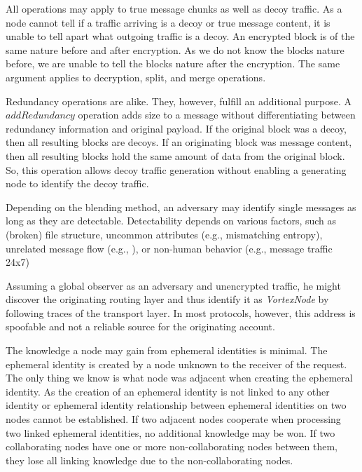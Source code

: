 \documentclass[acmsmall, screen]{acmart}
\begin{document}
All operations may apply to true message chunks as well as decoy traffic. As a node cannot tell if a traffic arriving is a decoy or true message content, it is unable to tell apart what outgoing traffic is a decoy. An encrypted block is of the same nature before and after encryption. As we do not know the blocks nature before, we are unable to tell the blocks nature after the encryption. The same argument applies to decryption, split, and merge operations. 

Redundancy operations are alike. They, however, fulfill an additional purpose. A $addRedundancy$ operation adds size to a message without differentiating between redundancy information and original payload. If the original block was a decoy, then all resulting blocks are decoys. If an originating block was message content, then all resulting blocks hold the same amount of data from the original block. So, this operation allows decoy traffic generation without enabling a generating node to identify the decoy traffic.

Depending on the blending method, an adversary may identify single messages as long as they are detectable. Detectability depends on various factors, such as (broken) file structure, uncommon attributes (e.g., mismatching entropy), unrelated message flow (e.g., \cite{oakland2013-parrot}), or non-human behavior (e.g., message traffic 24x7)

Assuming a global observer as an adversary and unencrypted traffic, he might discover the originating routing layer and thus identify it as \emph{VortexNode} by following traces of the transport layer. In most protocols, however, this address is spoofable and not a reliable source for the originating account.

The knowledge a node may gain from ephemeral identities is minimal. The ephemeral identity is created by a node unknown to the receiver of the request. The only thing we know is what node was adjacent when creating the ephemeral identity. As the creation of an ephemeral identity is not linked to any other identity or ephemeral identity relationship between ephemeral identities on two nodes cannot be established. If two adjacent nodes cooperate when processing two linked ephemeral identities, no additional knowledge may be won. If two collaborating nodes have one or more non-collaborating nodes between them, they lose all linking knowledge due to the non-collaborating nodes. 
\end{document}
